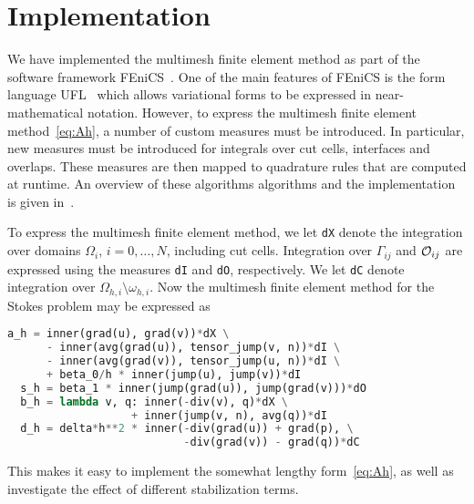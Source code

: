 \documentclass[graybox]{svmult}
\begin{document}

\section{Implementation}

We have implemented the multimesh finite element method as part of the software framework FEniCS~\cite{Logg:2012aa,Alnaes:2015aa}. One of the main features of FEniCS is the form language UFL~\cite{Alnaes:2014aa} which allows variational forms to be expressed in near-mathematical notation. However, to express the multimesh finite element method~\eqref{eq:Ah}, a number of custom measures must be introduced. In particular, new measures must be introduced for integrals over cut cells, interfaces and overlaps.
These measures are then mapped to quadrature rules that are computed at runtime. An overview of these algorithms algorithms and the implementation is given in~\cite{Johansson:2017ab}.

To express the multimesh finite element method, we let \texttt{dX} denote the integration over domains $\Omega_i$, $i=0, \ldots, N$, including cut cells. Integration over $\Gamma_{ij}$ and $\mathcal{O}_{ij}$ are expressed using the measures \texttt{dI} and \texttt{dO}, respectively. We let \texttt{dC} denote integration over $\Omega_{h,i} \setminus \omega_{h,i}$. Now the multimesh finite element method for the Stokes problem may be expressed as
\begin{lstlisting}[language=Python,numbers=none]
  a_h = inner(grad(u), grad(v))*dX \
      - inner(avg(grad(u)), tensor_jump(v, n))*dI \
      - inner(avg(grad(v)), tensor_jump(u, n))*dI \
      + beta_0/h * inner(jump(u), jump(v))*dI
  s_h = beta_1 * inner(jump(grad(u)), jump(grad(v)))*dO
  b_h = lambda v, q: inner(-div(v), q)*dX \
                   + inner(jump(v, n), avg(q))*dI
  d_h = delta*h**2 * inner(-div(grad(u)) + grad(p), \
                           -div(grad(v)) - grad(q))*dC
\end{lstlisting}
This makes it easy to implement the somewhat lengthy form~\eqref{eq:Ah}, as well as investigate the effect of different stabilization terms.
\end{document}
